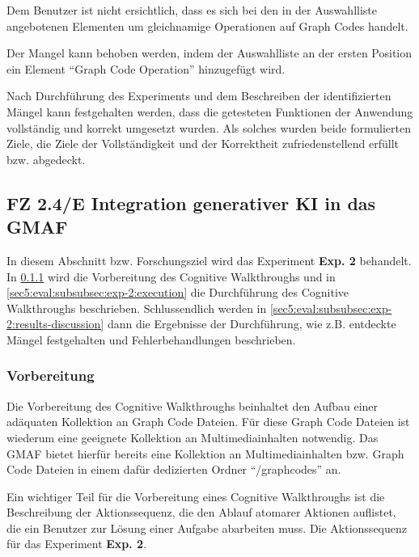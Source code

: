 Dem Benutzer ist nicht ersichtlich, dass es sich bei den in der Auswahlliste angebotenen Elementen um gleichnamige Operationen auf Graph Codes handelt.

Der Mangel kann behoben werden, indem der Auswahlliste an der ersten Position ein Element \enquote{Graph Code Operation} hinzugefügt wird.

Nach Durchführung des Experiments und dem Beschreiben der identifizierten Mängel kann festgehalten werden, dass die getesteten Funktionen der Anwendung vollständig und korrekt umgesetzt wurden.
Als solches wurden beide formulierten Ziele, die Ziele der Vollständigkeit und der Korrektheit zufriedenstellend erfüllt bzw. abgedeckt.

\clearpage

\subsection{FZ 2.4/E Integration generativer KI in das GMAF}
\label{sec5:eval:subsec:fz-integration}
In diesem Abschnitt bzw. Forschungsziel wird das Experiment \textbf{Exp. 2} behandelt.
In \cref{sec5:eval:subsubsec:exp-2:preparation} wird die Vorbereitung des Cognitive Walkthroughs und in \cref{sec5:eval:subsubsec:exp-2:execution} die Durchführung des Cognitive Walkthroughs beschrieben.
Schlussendlich werden in \cref{sec5:eval:subsubsec:exp-2:results-discussion} dann die Ergebnisse der Durchführung, wie z.B. entdeckte Mängel festgehalten und Fehlerbehandlungen beschrieben.


\subsubsection{Vorbereitung}
\label{sec5:eval:subsubsec:exp-2:preparation}
Die Vorbereitung des Cognitive Walkthroughs beinhaltet den Aufbau einer adäquaten Kollektion an Graph Code Dateien.
Für diese Graph Code Dateien ist wiederum eine geeignete Kollektion an Multimediainhalten notwendig.
Das GMAF bietet hierfür bereits eine Kollektion an Multimediainhalten bzw. Graph Code Dateien in einem dafür dedizierten Ordner \enquote{/graphcodes} an.

Ein wichtiger Teil für die Vorbereitung eines Cognitive Walkthroughs ist die Beschreibung der Aktionssequenz, die den Ablauf atomarer Aktionen auflistet, die ein Benutzer zur Lösung einer Aufgabe abarbeiten muss.
Die Aktionssequenz für das Experiment \textbf{Exp. 2}.

